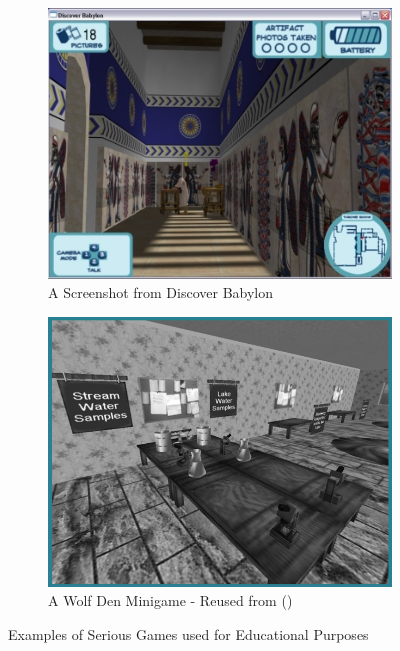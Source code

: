 \begin{figure}[H]
\centering
\begin{subfigure}{.5\textwidth}
  \centering
  \includegraphics[width=0.84\linewidth]{Figures/baby.png}
  \caption{A Screenshot from Discover Babylon}
\end{subfigure}%
\begin{subfigure}{.5\textwidth}
  \centering
  \includegraphics[width=0.84\linewidth]{Figures/wolf.png}
  \caption{A Wolf Den Minigame - Reused from (\cite{Annetta2008})}
\end{subfigure}
\caption{Examples of Serious Games used for Educational Purposes}
\end{figure}

